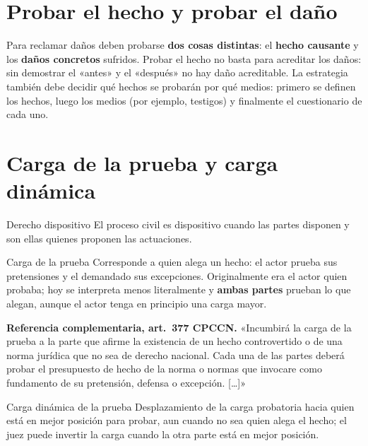 \documentclass[12pt,oneside]{book}
\begin{document}
\section{Probar el hecho y probar el daño}

\begin{importante}
Para reclamar daños deben probarse \textbf{dos cosas distintas}: el \textbf{hecho causante} y los \textbf{daños concretos} sufridos. Probar el hecho no basta para acreditar los daños: sin demostrar el «antes» y el «después» no hay daño acreditable. La estrategia también debe decidir qué hechos se probarán por qué medios: primero se definen los hechos, luego los medios (por ejemplo, testigos) y finalmente el cuestionario de cada uno.
\end{importante}

\section{Carga de la prueba y carga dinámica}

\begin{definicion}{Derecho dispositivo}
El proceso civil es dispositivo cuando las partes disponen y son ellas quienes proponen las actuaciones.
\end{definicion}

\begin{definicion}{Carga de la prueba}
Corresponde a quien alega un hecho: el actor prueba sus pretensiones y el demandado sus excepciones. Originalmente era el actor quien probaba; hoy se interpreta menos literalmente y \textbf{ambas partes} prueban lo que alegan, aunque el actor tenga en principio una carga mayor.
\end{definicion}

\begin{nota}
\textbf{Referencia complementaria, art.~377 CPCCN.}
«Incumbirá la carga de la prueba a la parte que afirme la existencia de un hecho controvertido o de una norma jurídica que no sea de derecho nacional. Cada una de las partes deberá probar el presupuesto de hecho de la norma o normas que invocare como fundamento de su pretensión, defensa o excepción. [\ldots]»
\end{nota}

\begin{definicion}{Carga dinámica de la prueba}
Desplazamiento de la carga probatoria hacia quien está en mejor posición para probar, aun cuando no sea quien alega el hecho; el juez puede invertir la carga cuando la otra parte está en mejor posición.
\end{definicion}
\end{document}
